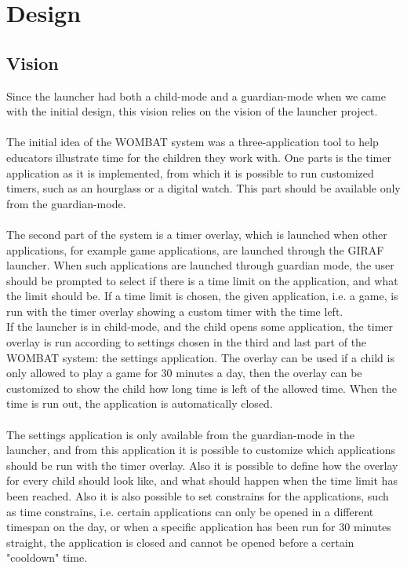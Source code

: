 \chapter{Design}


\section{Vision}
\label{sec:vision}
Since the launcher had both a child-mode and a guardian-mode when we came with the initial design, this vision relies on the vision of the launcher project.\\ \\
	The initial idea of the WOMBAT system was a three-application tool to help educators illustrate time for the children they work with. One parts is the timer application as it is implemented, from which it is possible to run customized timers, such as an hourglass or a digital watch. This part should be available only from the guardian-mode.\\ \\
  The second part of the system is a timer overlay, which is launched when other applications, for example game applications, are launched through the GIRAF launcher. When such applications are launched through guardian mode, the user should be prompted to select if there is a time limit on the application, and what the limit should be. If a time limit is chosen, the given application, i.e. a game, is run with the timer overlay showing a custom timer with the time left.\\
	If the launcher is in child-mode, and the child opens some application, the timer overlay is run according to settings chosen in the third and last part of the WOMBAT system: the settings application. The overlay can be used if a child is only allowed to play a game for 30 minutes a day, then the overlay can be customized to show the child how long time is left of the allowed time. When the time is run out, the application is automatically closed.\\ \\
	The settings application is only available from the guardian-mode in the launcher, and from this application it is possible to customize which applications should be run with the timer overlay. Also it is possible to define how the overlay for every child should look like, and what should happen when the time limit has been reached. Also it is also possible to set constrains for the applications, such as time constrains, i.e. certain applications can only be opened in a different timespan on the day, or when a specific application has been run for 30 minutes straight, the application is closed and cannot be opened before a certain "cooldown" time.

